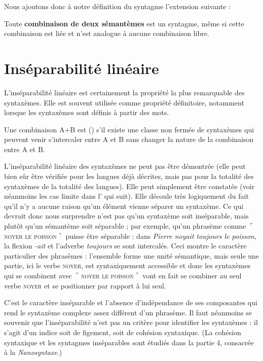 Nous ajoutons donc à notre définition du syntagme l’extension suivante :

{Toute \textbf{combinaison de deux sémantèmes} est un syntagme, même si cette combinaison est liée et n’est analogue à aucune combinaison libre.}

\section{Inséparabilité linéaire}\label{sec:3.1.15}

L’inséparabilité linéaire est certainement la propriété la plus remarquable des syntaxèmes. Elle est souvent utilisée comme propriété définitoire, notamment lorsque les syntaxèmes sont définis à partir des mots.

{Une combinaison A+B est ()  s’il existe une classe non fermée de syntaxèmes qui peuvent venir s’intercaler entre A et B sans changer la nature de la combinaison entre A et B.}

L’inséparabilité linéaire des syntaxèmes ne peut pas être démontrée (elle peut bien sûr être vérifiée pour les langues déjà décrites, mais pas pour la totalité des syntaxèmes de la totalité des langues). Elle peut simplement être constatée (voir néanmoins les cas limite dans l’ qui suit). Elle découle très logiquement du fait qu’il n’y a aucune raison qu’un élément vienne séparer un syntaxème. Ce qui devrait donc nous surprendre n’est pas qu’un syntaxème soit inséparable, mais plutôt qu’un sémantème soit séparable ; par exemple, qu’un phrasème comme $⌜$\textsc{noyer} \textsc{le} \textsc{poisson}$⌝$ puisse être séparable : dans \textit{Pierre noyait toujours le poisson}, la flexion \textit{{}-ait} et l’adverbe \textit{toujours} se sont intercalés. Ceci montre le caractère particulier des phrasèmes : l’ensemble forme une unité sémantique, mais seule une partie, ici le verbe \textsc{noyer}, est syntaxiquement accessible et donc les syntaxèmes qui se combinent avec $⌜$\textsc{noyer} \textsc{le} \textsc{poisson}$⌝$ vont en fait se combiner au seul verbe \textsc{noyer} et se positionner par rapport à lui seul.

C’est le caractère inséparable et l’absence d’indépendance de ses composantes qui rend le syntaxème complexe assez différent d’un phrasème. Il faut néanmoins se souvenir que l’inséparabilité n’est pas un critère pour identifier les syntaxèmes : il s’agit d’un indice soit de figement, soit de cohésion syntaxique. (La cohésion syntaxique et les syntagmes inséparables sont étudiés dans la partie 4, consacrée à la \textit{Nanosyntaxe}.)

